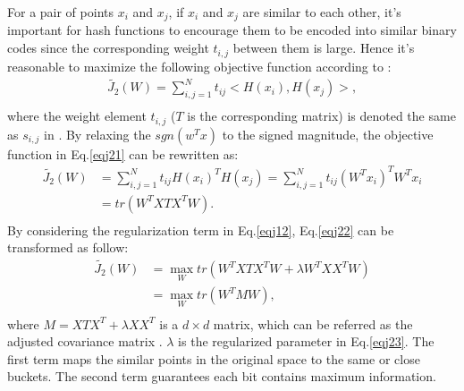 \documentclass{sig-alternate}
\begin{document}
For a pair of points $x_i$ and $x_j$, if $x_i$ and $x_j$ are similar to each other, it's important for hash functions to encourage them to be encoded into similar binary codes since the corresponding weight $t_{i, j}$ between them is large. Hence  it's reasonable to maximize the following objective function according to \cite{DBLP:iccvXuWLZLY11-12}:
\begin{equation}\label{eqj21}
    \begin{split}
\tilde{J_2}(W)=\sum_{i,j=1}^{N}t_{ij}<H(x_i), H(x_j)>,\\
    \end{split}
\end{equation}
where the weight element $t_{i, j}$ ($T$ is the corresponding matrix) is denoted the same as $s_{i, j}$ in \cite{DBLP:iccvXuWLZLY11-12}. By relaxing the $sgn(w^Tx)$ to the signed magnitude, the objective function in Eq.\ref{eqj21} can be rewritten as:
\begin{equation}\label{eqj22}
    \begin{split}
\tilde{J_2}(W) &=\sum_{i,j=1}^{N}t_{ij}H(x_i)^TH(x_j)=\sum_{i,j=1}^{N}t_{ij}(W^Tx_i)^TW^Tx_i\\
 &= tr(W^TXTX^TW).\\
    \end{split}
\end{equation}
By considering the regularization term in Eq.\eqref{eqj12}, Eq.\eqref{eqj22} can be transformed as follow:
\begin{equation}\label{eqj23}
    \begin{split}
\tilde{J_2}(W) &=\max_{W} tr(W^TXTX^TW+\lambda W^TXX^TW)\\
 &=\max_{W} tr(W^TMW),\\
    \end{split}
\end{equation}
where $M=XTX^T+\lambda XX^T$ is a $d \times d$ matrix, which can be referred as the adjusted covariance matrix \cite{DBLP:WangKC10-16}. $\lambda$ is the regularized parameter in Eq.\ref{eqj23}. The first term maps the similar points in the original space to the same or close buckets. The second term guarantees each bit contains maximum information.
\end{document}

